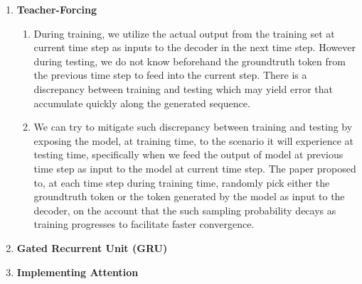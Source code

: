 \documentclass[11pt]{article}
\begin{document}
\begin{enumerate}
\item \textbf{Teacher-Forcing}

\begin{enumerate}
    \item During training, we utilize the actual output from the training set at current time step as inputs to the decoder in the next time step. However during testing, we do not know beforehand the groundtruth token from the previous time step to feed into the current step. There is a discrepancy between training and testing which may yield error that accumulate quickly along the generated sequence. 
    \item We can try to mitigate such discrepancy between training and testing by exposing the model, at training time, to the scenario it will experience at testing time, specifically when we feed the output of model at previous time step as input to the model at current time step. The paper proposed to, at each time step during training time, randomly pick either the groundtruth token or the token generated by the model as input to the decoder, on the account that the such sampling probability decays as training progresses to facilitate faster convergence. 
\end{enumerate}

\item \textbf{Gated Recurrent Unit (GRU)}
\item \textbf{Implementing Attention}

\newpage


\end{enumerate}
\end{document}
